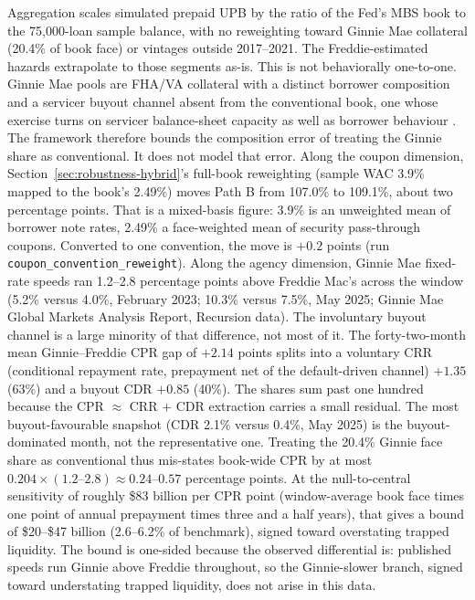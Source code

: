 \documentclass[12pt]{article}
\begin{document}
Aggregation scales simulated prepaid UPB by the ratio of the Fed's MBS book to the 75,000-loan sample balance, with no reweighting toward Ginnie Mae collateral (20.4\% of book face) or vintages outside 2017--2021. The Freddie-estimated hazards extrapolate to those segments as-is. This is not behaviorally one-to-one. Ginnie Mae pools are FHA/VA collateral with a distinct borrower composition and a servicer buyout channel absent from the conventional book, one whose exercise turns on servicer balance-sheet capacity as well as borrower behaviour \citep{aiello2022}. The framework therefore bounds the composition error of treating the Ginnie share as conventional. It does not model that error. Along the coupon dimension, Section~\ref{sec:robustness-hybrid}'s full-book reweighting (sample WAC 3.9\% mapped to the book's 2.49\%) moves Path B from 107.0\% to 109.1\%, about two percentage points. That is a mixed-basis figure: 3.9\% is an unweighted mean of borrower note rates, 2.49\% a face-weighted mean of security pass-through coupons. Converted to one convention, the move is $+0.2$ points (run \texttt{coupon\_convention\_reweight}). Along the agency dimension, Ginnie Mae fixed-rate speeds ran 1.2--2.8 percentage points above Freddie Mac's across the window (5.2\% versus 4.0\%, February 2023; 10.3\% versus 7.5\%, May 2025; Ginnie Mae Global Markets Analysis Report, Recursion data). The involuntary buyout channel is a large minority of that difference, not most of it. The forty-two-month mean Ginnie--Freddie CPR gap of $+2.14$ points splits into a voluntary CRR (conditional repayment rate, prepayment net of the default-driven channel) $+1.35$ (63\%) and a buyout CDR $+0.85$ (40\%). The shares sum past one hundred because the CPR $\approx$ CRR $+$ CDR extraction carries a small residual. The most buyout-favourable snapshot (CDR 2.1\% versus 0.4\%, May 2025) is the buyout-dominated month, not the representative one. Treating the 20.4\% Ginnie face share as conventional thus mis-states book-wide CPR by at most $0.204 \times (1.2\text{--}2.8) \approx 0.24$--$0.57$ percentage points. At the null-to-central sensitivity of roughly \$83 billion per CPR point (window-average book face times one point of annual prepayment times three and a half years), that gives a bound of \$20--\$47 billion (2.6--6.2\% of benchmark), signed toward overstating trapped liquidity. The bound is one-sided because the observed differential is: published speeds run Ginnie above Freddie throughout, so the Ginnie-slower branch, signed toward understating trapped liquidity, does not arise in this data.
\end{document}
